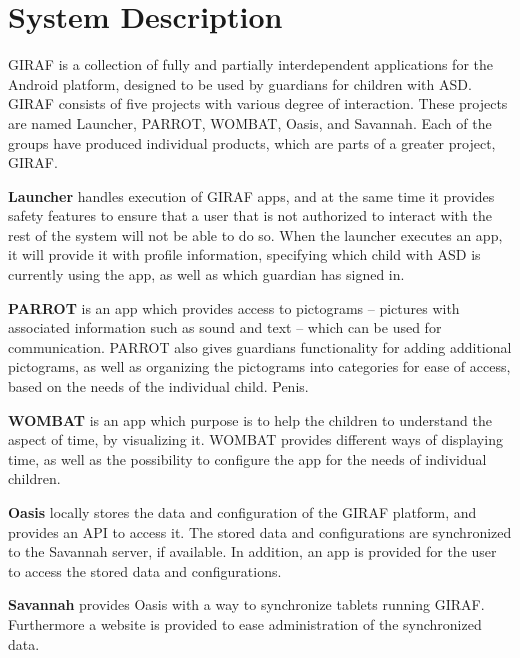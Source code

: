 \section{System Description}
\label{common:sec:sys_description}
GIRAF is a collection of fully and partially interdependent applications for the Android platform, designed to be used by guardians for children with ASD. GIRAF consists of five projects with various degree of interaction. These projects are named Launcher, PARROT, WOMBAT, Oasis, and Savannah. Each of the groups have produced individual products, which are parts of a greater project, GIRAF. 

\textbf{Launcher} handles execution of GIRAF apps, and at the same time it provides safety features to ensure that a user that is not authorized to interact with the rest of the system will not be able to do so. When the launcher executes an app, it will provide it with profile information, specifying which child with ASD is currently using the app, as well as which guardian has signed in.

\textbf{PARROT} is an app which provides access to pictograms -- pictures with associated information such as sound and text -- which can be used for communication. PARROT also gives guardians functionality for adding additional pictograms, as well as organizing the pictograms into categories for ease of access, based on the needs of the individual child. Penis.

\textbf{WOMBAT} is an app which purpose is to help the children to understand the aspect of time, by visualizing it. WOMBAT provides different ways of displaying time, as well as the possibility to configure the app for the needs of individual children. 

\textbf{Oasis} locally stores the data and configuration of the GIRAF platform, and provides an API to access it. The stored data and configurations are synchronized to the Savannah server, if available. In addition, an app is provided for the user to access the stored data and configurations.

\textbf{Savannah} provides Oasis with a way to synchronize tablets running GIRAF. Furthermore a website is provided to ease administration of the synchronized data.